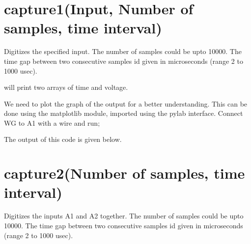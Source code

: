 \documentclass[a4paper,12pt,english]{sphinxmanual}
\begin{document}
\section{capture1(Input, Number of samples, time interval)}
\label{\detokenize{7.1:capture1-input-number-of-samples-time-interval}}
Digitizes the specified input. The number of samples could be upto
10000. The time gap between two consecutive samples id given in
microseconds (range 2 to 1000 usec).

\begin{sphinxVerbatim}[commandchars=\\\{\}]
   
\end{sphinxVerbatim}

will print two arrays of time and voltage.

We need to plot the graph of the output for a better understanding. This
can be done using the matplotlib module, imported using the pylab
interface. Connect WG to A1 with a wire and run;

\begin{sphinxVerbatim}[commandchars=\\\{\}]
   
 
    
\end{sphinxVerbatim}

The output of this code is given below.


\section{capture2(Number of samples, time interval)}
\label{\detokenize{7.1:capture2-number-of-samples-time-interval}}
Digitizes the inputs A1 and A2 together. The number of samples could be
upto 10000. The time gap between two consecutive samples id given in
microseconds (range 2 to 1000 usec).
\end{document}
